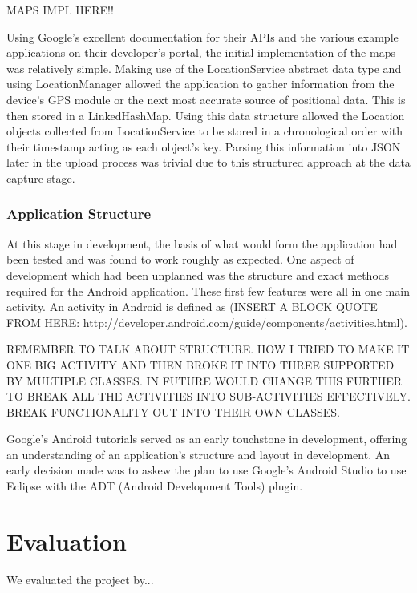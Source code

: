 \documentclass{l3proj}
\begin{document}
MAPS IMPL HERE!!

Using Google's excellent documentation for their APIs and the various example
applications on their developer's portal, the initial implementation of the maps
was relatively simple. Making use of the LocationService abstract data type and
using LocationManager allowed the application to gather information from the
device's GPS module or the next most accurate source of positional data. This is
then stored in a LinkedHashMap. Using this data structure allowed the Location
objects collected from LocationService to be stored in a chronological order
with their timestamp acting as each object's key. Parsing this information into
JSON later in the upload process was trivial due to this structured approach at
the data capture stage.

\subsection{Application Structure}
At this stage in development, the basis of what would form the application had been tested and was found to work roughly as expected. One aspect of development which had been unplanned was the structure and exact methods required for the Android application. These first few features were all in one main activity. An activity in Android is defined as (INSERT A BLOCK QUOTE FROM HERE:
http://developer.android.com/guide/components/activities.html).

REMEMBER TO TALK ABOUT STRUCTURE. HOW I TRIED TO MAKE IT ONE BIG ACTIVITY AND
THEN BROKE IT INTO THREE SUPPORTED BY MULTIPLE CLASSES. IN FUTURE WOULD CHANGE
THIS FURTHER TO BREAK ALL THE ACTIVITIES INTO SUB-ACTIVITIES EFFECTIVELY. BREAK
FUNCTIONALITY OUT INTO THEIR OWN CLASSES.

Google's Android tutorials served as an early touchstone in development,
offering an understanding of an application's structure and layout in
development. An early decision made was to askew the plan to use Google's
Android Studio to use Eclipse with the ADT (Android Development Tools) plugin.

\chapter{Evaluation}

We evaluated the project by...

\end{document}
